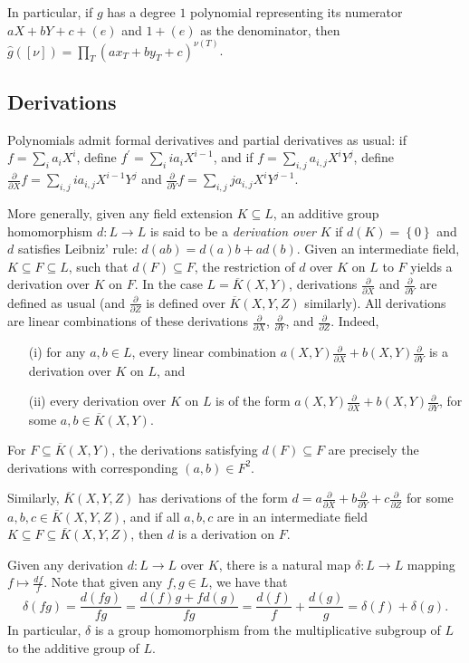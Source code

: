 \documentclass[11pt,letterpaper]{article}
\newcommand{\dX}{\frac{\partial}{\partial X}}
\newcommand{\dY}{\frac{\partial}{\partial Y}}
\newcommand{\dZ}{\frac{\partial}{\partial Z}}
\theoremstyle{definition}
\newcommand{\6}{\mathbf}
\newcommand{\7}{\mathcal}
\begin{document}
In particular, if $g$ has a degree $1$ polynomial representing its numerator $aX + bY + c + (e)$ and $1 + (e)$ as the denominator, then $\widehat{g}([\nu]) = \prod_T (ax_T + by_T + c)^{\nu(T)}$.



\subsection{Derivations}

Polynomials admit formal derivatives and partial derivatives as usual: if $f = \sum_i a_i X^i$, define $f^\prime = \sum_i i a_i X^{i-1}$, and if $f = \sum_{i,j} a_{i,j}X^i Y^j$, define $\dX f = \sum_{i,j} ia_{i,j}X^{i-1} Y^j$ and $\dY f = \sum_{i,j} ja_{i,j}X^iY^{j-1}$.

More generally, given any field extension $K \subseteq L$, an additive group homomorphism $d: L \to L$ is said to be a \textit{derivation over} $K$ if $d(K) = \left\{0\right\}$ and $d$ satisfies Leibniz' rule: $d(ab) = d(a)b + ad(b)$. Given an intermediate field, $K \subseteq F \subseteq L$, such that $d(F) \subseteq F$, the restriction of $d$ over $K$ on $L$ to $F$ yields a derivation over $K$ on $F$.  In the case $L=\overline{K}(X,Y)$, derivations $\dX$ and $\dY$ are defined as usual (and $\dZ$ is defined over $\overline{K}(X,Y,Z)$ similarly).
All derivations are linear combinations of these derivations $\dX$, $\dY$, and $\dZ$. Indeed, 
\begin{itemize}
    \item[(i)] for any $a, b \in L$, every linear combination $a(X,Y) \dX + b(X,Y) \dY$ is a derivation over $K$ on $L$, and 
    \item[(ii)] every derivation over $K$ on $L$ is of the form $a(X,Y) \dX + b(X,Y) \dY$, for some $a, b \in \overline{K}(X,Y)$. 
\end{itemize}
For $F \subseteq \overline{K}(X,Y)$, the  derivations satisfying $d(F) \subseteq F$ are precisely the derivations with corresponding $(a, b) \in F^2$.

Similarly, $\overline{K}(X,Y,Z)$ has derivations of the form $d=a\dX + b\dY + c\dZ$ for some $a, b, c \in \overline{K}(X,Y,Z)$, and if all $a, b, c$ are in an intermediate field $K \subseteq F \subseteq \overline{K}(X,Y,Z)$, then $d$ is a derivation on $F$.

Given any derivation $d:L \to L$ over $K$, there is a natural map $\delta:L \to L$ mapping $f \mapsto \frac{df}{f}$. Note that given any $f, g \in L$, we have that 
$$ \delta(fg) = \frac{d(fg)}{fg} = \frac{d(f)g + fd(g)}{fg} = \frac{d(f)}{f} + \frac{d(g)}{g} = \delta(f) + \delta(g).$$
In particular, $\delta$ is a group homomorphism from the multiplicative subgroup of $L$ to the additive group of $L$.
\end{document}
